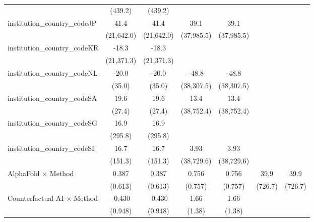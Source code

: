 \begin{tabular}{lcccccc}
                                         & (439.2)     & (439.2)     &             &             &             &   \\   
   institution\_country\_codeJP          & 41.4        & 41.4        & 39.1        & 39.1        &             &   \\   
                                         & (21,642.0)  & (21,642.0)  & (37,985.5)  & (37,985.5)  &             &   \\   
   institution\_country\_codeKR          & -18.3       & -18.3       &             &             &             &   \\   
                                         & (21,371.3)  & (21,371.3)  &             &             &             &   \\   
   institution\_country\_codeNL          & -20.0       & -20.0       & -48.8       & -48.8       &             &   \\   
                                         & (35.0)      & (35.0)      & (38,307.5)  & (38,307.5)  &             &   \\   
   institution\_country\_codeSA          & 19.6        & 19.6        & 13.4        & 13.4        &             &   \\   
                                         & (27.4)      & (27.4)      & (38,752.4)  & (38,752.4)  &             &   \\   
   institution\_country\_codeSG          & 16.9        & 16.9        &             &             &             &   \\   
                                         & (295.8)     & (295.8)     &             &             &             &   \\   
   institution\_country\_codeSI          & 16.7        & 16.7        & 3.93        & 3.93        &             &   \\   
                                         & (151.3)     & (151.3)     & (38,729.6)  & (38,729.6)  &             &   \\   
   AlphaFold $\times$ Method             & 0.387       & 0.387       & 0.756       & 0.756       & 39.9        & 39.9\\   
                                         & (0.613)     & (0.613)     & (0.757)     & (0.757)     & (726.7)     & (726.7)\\   
   Counterfactual AI $\times$ Method     & -0.430      & -0.430      & 1.66        & 1.66        &             &   \\   
                                         & (0.948)     & (0.948)     & (1.38)      & (1.38)      &             &   \\   

\end{tabular}
